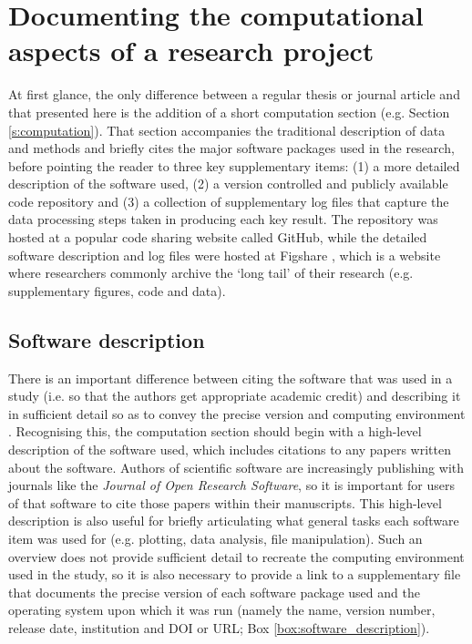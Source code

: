   
\section{Documenting the computational aspects of a research project}\label{s:reproducibility_approach}

At first glance, the only difference between a regular thesis or journal article and that presented here is the addition of a short computation section (e.g. Section \ref{s:computation}). That section accompanies the traditional description of data and methods and briefly cites the major software packages used in the research, before pointing the reader to three key supplementary items: (1) a more detailed description of the software used, (2) a version controlled and publicly available code repository and (3) a collection of supplementary log files that capture the data processing steps taken in producing each key result. The repository was hosted at a popular code sharing website called GitHub, while the detailed software description and log files were hosted at Figshare \citep{IrvingFigshare2016}, which is a website where researchers commonly archive the `long tail' of their research (e.g. supplementary figures, code and data). 

\subsection{Software description}

There is an important difference between citing the software that was used in a study (i.e. so that the authors get appropriate academic credit) and describing it in sufficient detail so as to convey the precise version and computing environment \citep{Jackson2012}. Recognising this, the computation section should begin with a high-level description of the software used, which includes citations to any papers written about the software. Authors of scientific software are increasingly publishing with journals like the \textit{Journal of Open Research Software}, so it is important for users of that software to cite those papers within their manuscripts. This high-level description is also useful for briefly articulating what general tasks each software item was used for (e.g. plotting, data analysis, file manipulation). Such an overview does not provide sufficient detail to recreate the computing environment used in the study, so it is also necessary to provide a link to a supplementary file that documents the precise version of each software package used and the operating system upon which it was run (namely the name, version number, release date, institution and DOI or URL; Box \ref{box:software_description}). 

